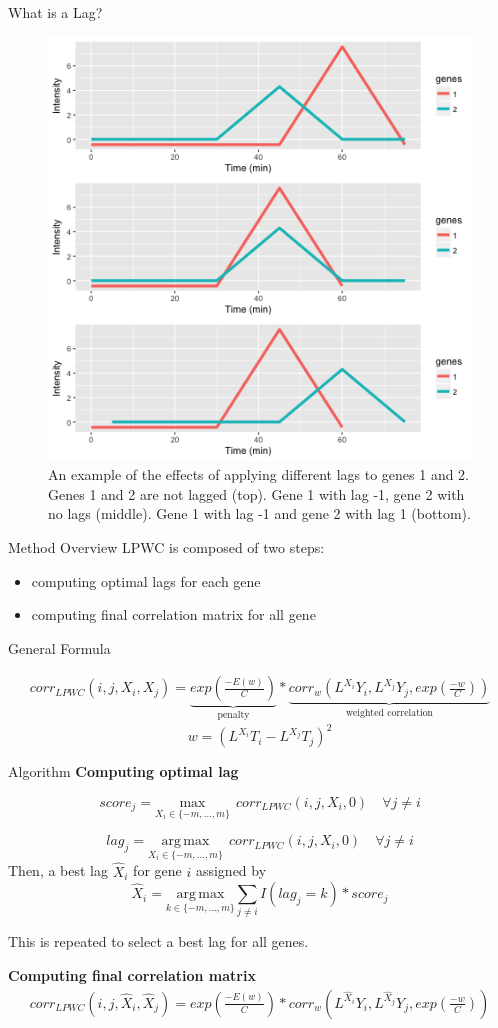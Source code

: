 \documentclass[10pt]{beamer}
\begin{document}
\begin{frame}{What is a Lag?}
\begin{figure}
     \includegraphics[width=0.60\linewidth]{Lags.png}
      \caption{An example of the effects of applying different lags to genes 1 and 2.  Genes 1 and 2 are not lagged (top). Gene 1 with lag -1, gene 2 with no lags (middle). Gene 1 with lag -1 and gene 2 with lag 1 (bottom).}
       \label{fig:lags}
    \end{figure}

\end{frame}


\begin{frame}{Method Overview}
LPWC is composed of two steps:
\begin{itemize}
\item computing optimal lags for each gene
\item computing final correlation matrix for all gene
\end{itemize}

General Formula

\begin{multline*}
corr_{LPWC}(i, j, X_i, X_j) = \underbrace{exp(\frac{- E(w)}{C})}_{\text{penalty}}  * 
\underbrace{corr_w(L^{X_i}Y_i, L^{X_j}Y_j, exp(\frac{- w}{C}))}_{\text{weighted correlation}}
\end{multline*}
$$w = (L^{X_i}T_i - L^{X_j}T_j)^2$$
\end{frame}

\begin{frame}{Algorithm}
\textbf{Computing optimal lag}

$$score_{j} = \underset{X_i \in \{-m,..., m\}}{\mathrm{max}} \;\, corr_{LPWC}(i, j, X_i, 0) \quad \forall j \neq i$$

$$lag_{j} = \underset{X_i \in \{-m,..., m\}}{\mathrm{arg \,max}} \;\, corr_{LPWC}(i, j, X_i, 0) \quad \forall j \neq i$$
Then, a best lag $\hat{X}_i$ for gene $i$ assigned by 
\[
\hat{X}_i = \underset{k \in \{-m, ..., m\}}{\mathrm{arg \,max}} \sum_{j \neq i} I(lag_j = k) * score_j
\]

This is repeated to select a best lag for all genes.

\textbf{Computing final correlation matrix}
\begin{multline*}
 corr_{LPWC}(i, j, \hat{X}_i, \hat{X}_j) = 
exp(\frac{- E(w)}{C}) * corr_w(L^{\hat{X}_i}Y_i, L^{\hat{X}_j}Y_j, exp(\frac{- w}{C}))
\end{multline*}
\end{frame}
\end{document}
